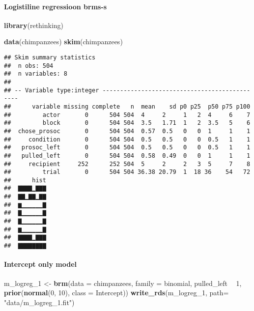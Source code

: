 \documentclass[]{article}
\newenvironment{Shaded}{\begin{snugshade}}{\end{snugshade}}
\newcommand{\KeywordTok}[1]{\textcolor[rgb]{0.13,0.29,0.53}{\textbf{#1}}}
\newcommand{\DataTypeTok}[1]{\textcolor[rgb]{0.13,0.29,0.53}{#1}}
\newcommand{\DecValTok}[1]{\textcolor[rgb]{0.00,0.00,0.81}{#1}}
\newcommand{\StringTok}[1]{\textcolor[rgb]{0.31,0.60,0.02}{#1}}
\newcommand{\OperatorTok}[1]{\textcolor[rgb]{0.81,0.36,0.00}{\textbf{#1}}}
\newcommand{\NormalTok}[1]{#1}
\let\oldparagraph\paragraph
\renewcommand{\paragraph}[1]{\oldparagraph{#1}\mbox{}}
\begin{document}
\paragraph{Logistiline regressioon
brms-s}\label{logistiline-regressioon-brms-s}

\begin{Shaded}
\begin{Highlighting}[]
\KeywordTok{library}\NormalTok{(rethinking)}
\end{Highlighting}
\end{Shaded}

\begin{Shaded}
\begin{Highlighting}[]
\KeywordTok{data}\NormalTok{(chimpanzees)}
\KeywordTok{skim}\NormalTok{(chimpanzees)}
\end{Highlighting}
\end{Shaded}

\begin{verbatim}
## Skim summary statistics
##  n obs: 504 
##  n variables: 8 
## 
## -- Variable type:integer ----------------------------------------------
##      variable missing complete   n  mean    sd p0 p25  p50 p75 p100
##         actor       0      504 504  4     2     1   2  4     6    7
##         block       0      504 504  3.5   1.71  1   2  3.5   5    6
##  chose_prosoc       0      504 504  0.57  0.5   0   0  1     1    1
##     condition       0      504 504  0.5   0.5   0   0  0.5   1    1
##   prosoc_left       0      504 504  0.5   0.5   0   0  0.5   1    1
##   pulled_left       0      504 504  0.58  0.49  0   0  1     1    1
##     recipient     252      252 504  5     2     2   3  5     7    8
##         trial       0      504 504 36.38 20.79  1  18 36    54   72
##      hist
##  ▇▇▇▇▁▇▇▇
##  ▇▇▁▇▇▁▇▇
##  ▆▁▁▁▁▁▁▇
##  ▇▁▁▁▁▁▁▇
##  ▇▁▁▁▁▁▁▇
##  ▆▁▁▁▁▁▁▇
##  ▇▇▇▇▁▇▇▇
##  ▇▇▇▇▇▇▇▇
\end{verbatim}

\paragraph{Intercept only model}\label{intercept-only-model}

\begin{Shaded}
\begin{Highlighting}[]
\NormalTok{m_logreg_}\DecValTok{1}\NormalTok{ <-}\StringTok{ }\KeywordTok{brm}\NormalTok{(}\DataTypeTok{data =}\NormalTok{ chimpanzees, }
                  \DataTypeTok{family =}\NormalTok{ binomial,}
\NormalTok{                  pulled_left }\OperatorTok{~}\StringTok{ }\DecValTok{1}\NormalTok{,}
                  \KeywordTok{prior}\NormalTok{(}\KeywordTok{normal}\NormalTok{(}\DecValTok{0}\NormalTok{, }\DecValTok{10}\NormalTok{), }\DataTypeTok{class =}\NormalTok{ Intercept))}
\KeywordTok{write_rds}\NormalTok{(m_logreg_}\DecValTok{1}\NormalTok{, }\DataTypeTok{path=} \StringTok{"data/m_logreg_1.fit"}\NormalTok{)}
\end{Highlighting}
\end{Shaded}
\end{document}

